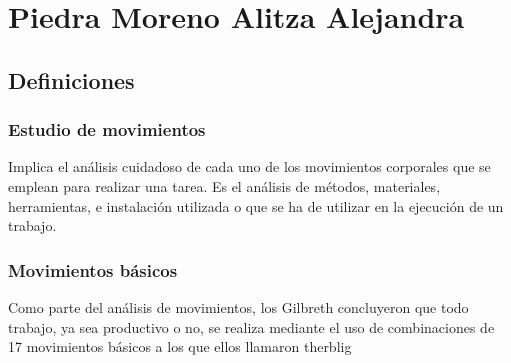 \section{Piedra Moreno Alitza Alejandra}
\subsection{Definiciones}

\subsubsection{Estudio de movimientos}

Implica el análisis cuidadoso de cada uno de los movimientos corporales que se emplean para realizar una tarea. 
\cite{niebel1980ingenieria}
Es el análisis de métodos, materiales, herramientas, e instalación utilizada o que se ha de utilizar en la ejecución de un trabajo.

\subsubsection{Movimientos básicos} 
Como parte del análisis de movimientos, los Gilbreth concluyeron que todo trabajo, ya sea productivo o no, se realiza mediante el uso de combinaciones de 17 movimientos básicos a los que ellos llamaron therblig \cite{niebel1980ingenieria}  

